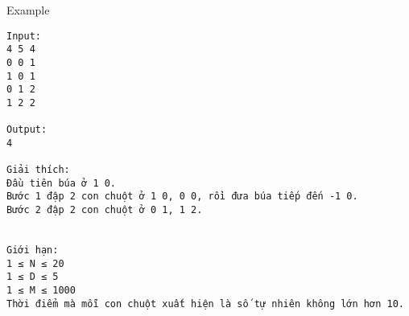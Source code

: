 Example
\begin{verbatim}
Input:
4 5 4
0 0 1
1 0 1
0 1 2
1 2 2

Output:
4

Giải thích:
Đầu tiên búa ở 1 0.
Bước 1 đập 2 con chuột ở 1 0, 0 0, rồi đưa búa tiếp đến -1 0.
Bước 2 đập 2 con chuột ở 0 1, 1 2.


Giới hạn:
1 ≤ N ≤ 20
1 ≤ D ≤ 5
1 ≤ M ≤ 1000
Thời điểm mà mỗi con chuột xuất hiện là số tự nhiên không lớn hơn 10.
\end{verbatim}